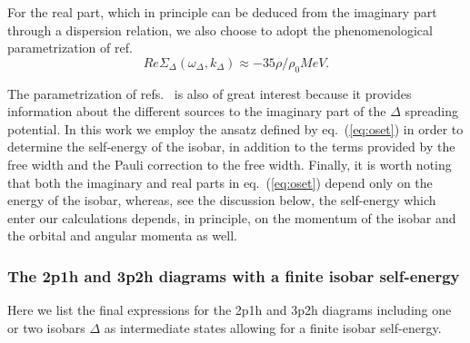 For the real part, which in principle can be deduced from the imaginary part
through a dispersion relation, we also choose to adopt the  phenomenological
parametrization of ref.\ \cite{os87}
\[
Re\Sigma_{\Delta}(\omega_{\Delta},k_{\Delta})\approx -35\rho/\rho_0 MeV. 
\]

The parametrization of refs.\ \cite{os87,nieves93} is also of great interest because
it provides information about the different sources to the imaginary part
of the $\Delta$ spreading potential. In this work we employ the ansatz
defined by eq.\ (\ref{eq:oset}) in order to determine the self-energy of the
isobar, in addition to the terms provided by the free width and the Pauli
correction to the free width.
Finally, it is worth noting that both the imaginary and real parts 
in eq.\ (\ref{eq:oset}) 
depend only on the
energy of the isobar, whereas, see the discussion below, 
the self-energy which enter our calculations depends, in principle,
on the momentum of the isobar and the  orbital and angular momenta
as well.

\subsubsection{The 2p1h and 3p2h diagrams with a finite isobar self-energy}

Here we list the final expressions for the 2p1h and 3p2h diagrams including
one or two isobars $\Delta$ as intermediate states allowing for a 
finite isobar self-energy.

